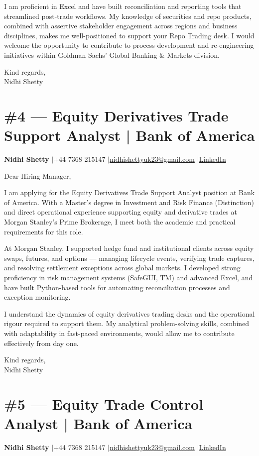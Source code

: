\documentclass[11pt,a4paper]{article}
\makeatletter
\newcommand{\coverheader}{%
\begin{flushleft}
{\bfseries Nidhi Shetty} \enspace$\vert$\enspace +44 7368 215147 \enspace$\vert$\enspace \href{mailto:nidhishettyuk23@gmail.com}{nidhishettyuk23@gmail.com} \enspace$\vert$\enspace \href{https://www.linkedin.com/in/nidhi-shetty23-1841b7181}{LinkedIn}
\end{flushleft}
\vspace{4pt}
}
\makeatother
\begin{document}
I am proficient in Excel and have built reconciliation and reporting tools that streamlined post-trade workflows. My knowledge of securities and repo products, combined with assertive stakeholder engagement across regions and business disciplines, makes me well-positioned to support your Repo Trading desk. I would welcome the opportunity to contribute to process development and re-engineering initiatives within Goldman Sachs' Global Banking \& Markets division.

\vspace{8pt}
Kind regards,\\
Nidhi Shetty

\newpage
\section{\#4 --- Equity Derivatives Trade Support Analyst | Bank of America}
\coverheader

Dear Hiring Manager,

I am applying for the Equity Derivatives Trade Support Analyst position at Bank of America. With a Master's degree in Investment and Risk Finance (Distinction) and direct operational experience supporting equity and derivative trades at Morgan Stanley's Prime Brokerage, I meet both the academic and practical requirements for this role.

At Morgan Stanley, I supported hedge fund and institutional clients across equity swaps, futures, and options --- managing lifecycle events, verifying trade captures, and resolving settlement exceptions across global markets. I developed strong proficiency in risk management systems (SafeGUI, TM) and advanced Excel, and have built Python-based tools for automating reconciliation processes and exception monitoring.

I understand the dynamics of equity derivatives trading desks and the operational rigour required to support them. My analytical problem-solving skills, combined with adaptability in fast-paced environments, would allow me to contribute effectively from day one.

\vspace{8pt}
Kind regards,\\
Nidhi Shetty

\newpage
\section{\#5 --- Equity Trade Control Analyst | Bank of America}
\coverheader
\end{document}
